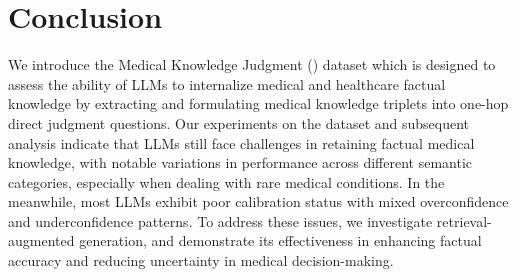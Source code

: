 \section{Conclusion}
We introduce the Medical Knowledge Judgment (\mkj) dataset which is designed to assess the ability of LLMs to internalize medical and healthcare factual knowledge by extracting and formulating medical knowledge triplets into one-hop direct judgment questions.
Our experiments on the \mkj dataset and subsequent analysis indicate that LLMs still face challenges in retaining factual medical knowledge, with notable variations in performance across different semantic categories, especially when dealing with rare medical conditions.
In the meanwhile, most LLMs exhibit poor calibration status with mixed overconfidence and underconfidence patterns.
To address these issues, we investigate retrieval-augmented generation, and demonstrate its effectiveness in enhancing factual accuracy and reducing uncertainty in medical decision-making. 



